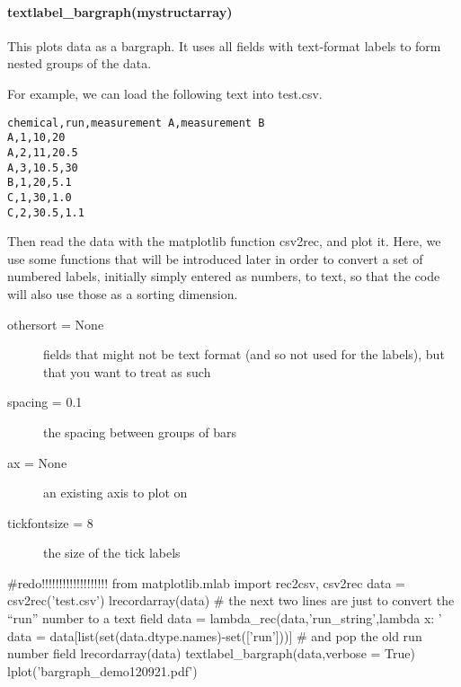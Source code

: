 \paragraph{textlabel\_bargraph(mystructarray)}
This plots data as a bargraph.
It uses all fields with text-format labels to form nested groups of the data.

For example, we can load the following text into test.csv.

\begin{verbatim}
chemical,run,measurement A,measurement B
A,1,10,20
A,2,11,20.5
A,3,10.5,30
B,1,20,5.1
C,1,30,1.0
C,2,30.5,1.1
\end{verbatim}

Then read the data with the matplotlib function csv2rec,
    and plot it.
Here, we use some functions that will be introduced later in order
    to convert a set of numbered labels, initially simply entered as numbers,
    to text, so that the code will also use those as a sorting dimension.

\begin{mykwargs}
    \begin{description}
        \item[othersort = None] fields that might not be text format (and so not used for the labels), but that you want to treat as such
        \item[spacing = 0.1]  the spacing between groups of bars
        \item[ax = None] an existing axis to plot on
        \item[tickfontsize = 8] the size of the tick labels
    \end{description}
\end{mykwargs}

\begin{python}
#redo!!!!!!!!!!!!!!!!!!!
from matplotlib.mlab import rec2csv, csv2rec
data = csv2rec('test.csv')
lrecordarray(data)
# the next two lines are just to convert the ``run'' number to a text field
data = lambda_rec(data,'run_string',lambda x: '%
data = data[list(set(data.dtype.names)-set(['run']))] # and pop the old run number field
lrecordarray(data)
textlabel_bargraph(data,verbose = True)
lplot('bargraph_demo120921.pdf')
\end{python}

